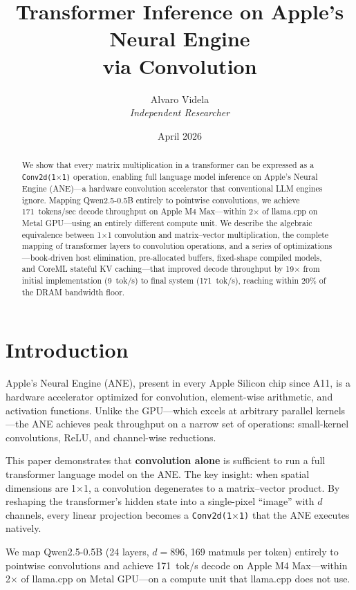 \documentclass[11pt,twocolumn]{article}
\title{Transformer Inference on Apple's Neural Engine\\via Convolution}
\author{Alvaro Videla\\
\textit{Independent Researcher}}
\date{April 2026}
\begin{document}
\maketitle

\begin{abstract}
We show that every matrix multiplication in a transformer can be
expressed as a \texttt{Conv2d(1$\times$1)} operation, enabling full
language model inference on Apple's Neural Engine (ANE)---a hardware
convolution accelerator that conventional LLM engines ignore.
%
Mapping Qwen2.5-0.5B entirely to pointwise convolutions, we achieve
171~tokens/sec decode throughput on Apple M4 Max---within 2$\times$ of
llama.cpp on Metal GPU---using an entirely different compute unit.
%
We describe the algebraic equivalence between 1$\times$1 convolution
and matrix--vector multiplication, the complete mapping of transformer
layers to convolution operations, and a series of
optimizations---book-driven host elimination, pre-allocated buffers,
fixed-shape compiled models, and CoreML stateful KV
caching---that improved decode throughput by 19$\times$ from initial
implementation (9~tok/s) to final system (171~tok/s), reaching within
20\% of the DRAM bandwidth floor.
\end{abstract}

\section{Introduction}
\label{sec:intro}

Apple's Neural Engine (ANE), present in every Apple Silicon chip since
A11, is a hardware accelerator optimized for convolution, element-wise
arithmetic, and activation functions. Unlike the GPU---which excels at
arbitrary parallel kernels---the ANE achieves peak throughput on a
narrow set of operations: small-kernel convolutions, ReLU, and
channel-wise reductions.

This paper demonstrates that \textbf{convolution alone} is sufficient
to run a full transformer language model on the ANE.  The key insight:
when spatial dimensions are 1$\times$1, a convolution degenerates to a
matrix--vector product.  By reshaping the transformer's hidden state
into a single-pixel ``image'' with $d$ channels, every linear
projection becomes a \texttt{Conv2d(1$\times$1)} that the ANE executes
natively.

We map Qwen2.5-0.5B (24 layers, $d{=}896$, 169 matmuls per token)
entirely to pointwise convolutions and achieve 171~tok/s decode on
Apple M4 Max---within 2$\times$ of llama.cpp on Metal GPU---on a
compute unit that llama.cpp does not use.
\end{document}

